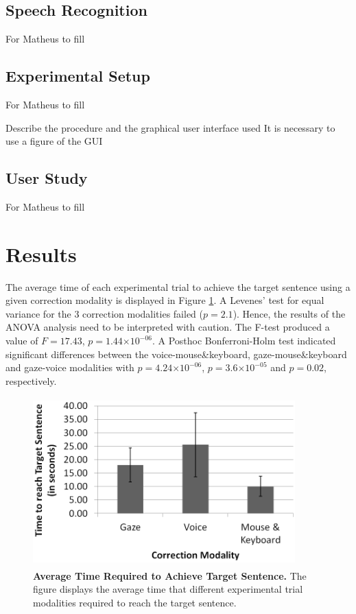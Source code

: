 \documentclass[]{article}
\providecommand{\e}[1]{\ensuremath{\times 10^{#1}}}
\begin{document}
\subsection{Speech Recognition}
For Matheus to fill


\subsection{Experimental Setup}
For Matheus to fill

Describe the procedure and the graphical user interface used
It is necessary to use a figure of the GUI


\subsection{User Study}
For Matheus to fill


\section{Results}
The average time of each experimental trial to achieve the target sentence using a given correction modality is
displayed in Figure \ref{timeFig}. A Levenes' test for equal variance for the 3 correction modalities failed ($p=2.1$).
Hence, the results of the ANOVA analysis need to be interpreted with caution. The F-test produced a value of $F=17.43$,
$p=1.44\e{-06}$. A Posthoc Bonferroni-Holm test indicated significant differences between the voice-mouse\&keyboard,
gaze-mouse\&keyboard and gaze-voice modalities with $p=4.24\e{-06}$, $p=3.6\e{-05}$ and $p=0.02$, respectively.
 

\begin{figure}[ht]
\begin{center}
\vspace{-3mm}
\includegraphics[width=0.9\textwidth,height=65mm]{figures/time.png}
\end{center}
\caption{\textbf{Average Time Required to Achieve Target Sentence.} The figure displays the average time that different
experimental trial modalities required to reach the target sentence.}
\label{timeFig}
\end{figure}
\end{document}
